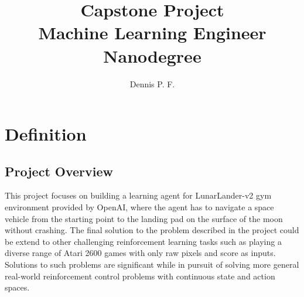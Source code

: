 \documentclass{article}
\begin{document}
\title{Capstone Project \\ {\large Machine Learning Engineer Nanodegree}}
\author{Dennis P. F.}
\maketitle
\pagestyle{empty}
\section{Definition}
\subsection*{Project Overview}
This project focuses on building a learning agent for LunarLander-v2 gym environment provided by OpenAI\cite{challenge}, where the agent has to navigate a space vehicle from the starting point to the landing pad on the surface of the moon without crashing. The final solution to the problem described in the project could be extend to other challenging reinforcement learning tasks such as playing a diverse range of Atari 2600 games\cite{atari2600} with only raw pixels and score as inputs\cite{DQN}. Solutions to such problems are significant while in pursuit of solving more general real-world reinforcement control problems with continuous state and action spaces.
\end{document}
